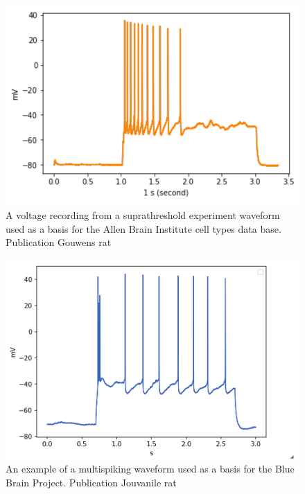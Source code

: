 \begin{figure}
    \begin{center}
    
    \includegraphics[width=0.6\linewidth]{figures/multi_spiking_large_allen}
    \caption{A voltage recording from a suprathreshold experiment waveform used as a basis for the Allen Brain Institute cell types data base. Publication Gouwens rat \cite{gouwens2018systematic}}

    \end{center}
    
\end{figure}    

\begin{figure}  
    \begin{center}
    
    \includegraphics[width=0.6\linewidth]{figures/multi_spiking_large_bbp}
    \caption{An example of a multispiking waveform used as a basis for the Blue Brain Project. Publication Jouvanile rat \cite{toledo}}


    \end{center}
\end{figure}    



